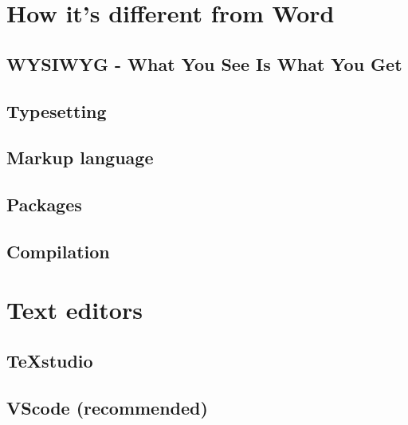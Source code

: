 \section{How it's different from Word}
    \subsection{WYSIWYG - What You See Is What You Get}
    \subsection{Typesetting}
    \subsection{Markup language}
    \subsection{Packages}
    \subsection{Compilation}
\section{Text editors}
    \subsection{TeXstudio}
    \subsection{VScode (recommended)}